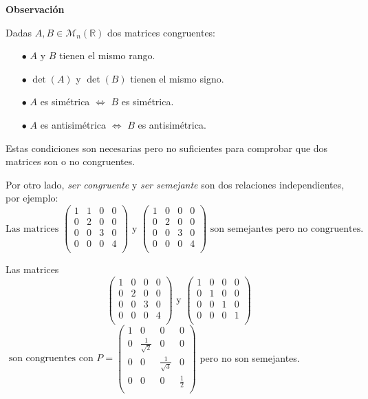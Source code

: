 \documentclass[x11names,table]{report}
\begin{document}
\textbf{Observación}

Dadas $A,B\in\mathcal{M}_n(\mathbb{R})$ dos matrices congruentes:
\begin{itemize}
\item[$\bullet$] $A$ y $B$ tienen el mismo rango.
\item[$\bullet$] $\det(A)$ y $\det(B)$ tienen el mismo signo.
\item[$\bullet$] $A$ es simétrica $\Leftrightarrow$ $B$ es simétrica.
\item[$\bullet$] $A$ es antisimétrica $\Leftrightarrow$ $B$ es antisimétrica.
\end{itemize}
Estas condiciones son necesarias pero no suficientes para comprobar que dos matrices son o no congruentes.

Por otro lado, \textit{ser congruente} y \textit{ser semejante} son dos relaciones independientes, por ejemplo:
\[\text{Las matrices }\begin{pmatrix}
1 & 1 & 0 & 0\\
0 & 2 & 0 & 0\\
0 & 0 & 3 & 0\\
0 & 0 & 0 & 4\\
\end{pmatrix} \text{ y }\begin{pmatrix}
1 & 0 & 0 & 0\\
0 & 2 & 0 & 0\\
0 & 0 & 3 & 0\\
0 & 0 & 0 & 4\\
\end{pmatrix}\text{ son semejantes pero no congruentes.}\]

Las matrices\[
\begin{pmatrix}
1 & 0 & 0 & 0\\
0 & 2 & 0 & 0\\
0 & 0 & 3 & 0\\
0 & 0 & 0 & 4\\
\end{pmatrix}\text{ y } \begin{pmatrix}
1 & 0 & 0 & 0\\
0 & 1 & 0 & 0\\
0 & 0 & 1 & 0\\
0 & 0 & 0 & 1\\
\end{pmatrix}\]\(
\text{ son congruentes con }P=\begin{pmatrix}
1 & 0 & 0 & 0\\
0 & \frac{1}{\sqrt{2}} & 0 & 0\\
0 & 0 & \frac{1}{\sqrt{3}} & 0\\
0 & 0 & 0 & \frac{1}{2}\\
\end{pmatrix}\) pero no son semejantes.
\end{document}
